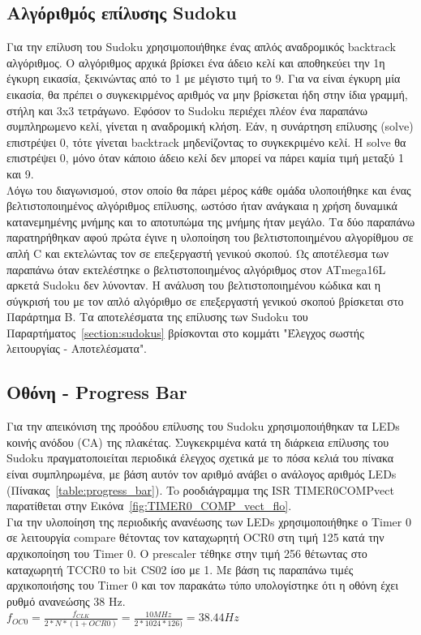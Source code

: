 \documentclass[a4paper,12pt]{article}
\begin{document}
\subsection{Αλγόριθμός επίλυσης Sudoku} \label{section:algorithm_analysis}
Για την επίλυση του Sudoku χρησιμοποιήθηκε ένας απλός αναδρομικός backtrack αλγόριθμος. Ο αλγόριθμος αρχικά βρίσκει ένα άδειο κελί και αποθηκεύει την 1η έγκυρη εικασία, ξεκινώντας από το 1 με μέγιστο τιμή το 9. Για να είναι έγκυρη μία εικασία, θα πρέπει ο συγκεκιρμένος αριθμός να μην βρίσκεται ήδη στην ίδια γραμμή, στήλη και 3x3 τετράγωνο. Εφόσον το Sudoku περιέχει πλέον ένα παραπάνω συμπληρωμενο κελί, γίνεται η αναδρομική κλήση. Εάν, η συνάρτηση επίλυσης (solve) επιστρέψει 0, τότε γίνεται backtrack μηδενίζοντας το συγκεκριμένο κελί. Η solve θα επιστρέψει 0, μόνο όταν κάποιο άδειο κελί δεν μπορεί να πάρει καμία τιμή μεταξύ 1 και 9.\\
Λόγω του διαγωνισμού, στον οποίο θα πάρει μέρος κάθε ομάδα υλοποιήθηκε και ένας βελτιστοποιημένος αλγόριθμος επίλυσης, ωστόσο ήταν ανάγκαια η χρήση δυναμικά κατανεμημένης μνήμης και το αποτυπώμα της μνήμης ήταν μεγάλο. Τα δύο παραπάνω παρατηρήθηκαν αφού πρώτα έγινε η υλοποίηση του βελτιστοποιημένου αλγορίθμου σε απλή C και εκτελώντας τον σε επεξεργαστή γενικού σκοπού. Ως αποτέλεσμα των παραπάνω όταν εκτελέστηκε ο βελτιστοποιημένος αλγόριθμος στον ATmega16L αρκετά Sudoku δεν λύνονταν. Η ανάλυση του βελτιστοποιημένου κώδικα και η σύγκρισή του με τον απλό αλγόριθμο σε επεξεργαστή γενικού σκοπού βρίσκεται στο Παράρτημα Β. Τα αποτελέσματα της επίλυσης των Sudoku του Παραρτήματος~\ref{section:sudokus} βρίσκονται στο κομμάτι "Έλεγχος σωστής λειτουργίας - Αποτελέσματα".\\


\subsection{Οθόνη - Progress Bar}
Για την απεικόνιση της προόδου επίλυσης του Sudoku χρησιμοποιήθηκαν τα LEDs κοινής ανόδου (CA) της πλακέτας. Συγκεκριμένα κατά τη διάρκεια επίλυσης του Sudoku πραγματοποιείται περιοδικά έλεγχος σχετικά με το πόσα κελιά του πίνακα είναι συμπληρωμένα, με βάση αυτόν τον αριθμό ανάβει ο ανάλογος αριθμός LEDs (Πίνακας~\ref{table:progress_bar}). To ροοδιάγραμμα της ISR TIMER0\textunderscore COMP\textunderscore vect παρατίθεται στην Εικόνα~\ref{fig:TIMER0_COMP_vect_flo}.\\
Για την υλοποίηση της περιοδικής ανανέωσης των LEDs χρησιμοποιήθηκε ο Timer 0 σε λειτουργία compare θέτοντας τον καταχωρητή OCR0 στη τιμή 125 κατά την αρχικοποίηση του Timer 0. Ο prescaler τέθηκε στην τιμή 256 θέτωντας στο καταχωρητή TCCR0 το bit CS02 ίσο με 1. Με βάση τις παραπάνω τιμές αρχικοποιήσης του Timer 0 και τον παρακάτω τύπο υπολογίστηκε ότι η οθόνη έχει ρυθμό ανανεώσης 38 Hz.\\
$f_{OC0} = \frac{f_{CLK}}{2*N*(1+OCR0)} = \frac{10 MHz}{2*1024*126)} = 38.44 Hz$ \\
\end{document}
